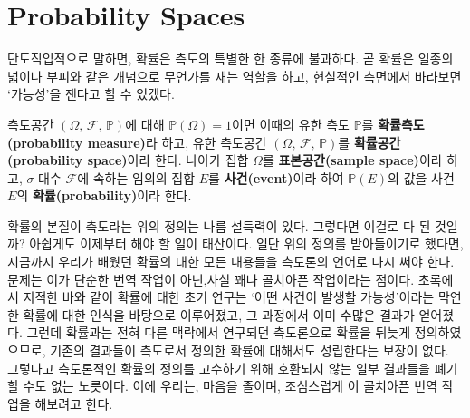 
\section{Probability Spaces}

단도직입적으로 말하면, 확률은 측도의 특별한 한 종류에 불과하다. 곧 확률은 일종의 넓이나 부피와 같은 개념으로 무언가를 재는 역할을 하고, 현실적인 측면에서 바라보면 `가능성'을 잰다고 할 수 있겠다.

\begin{definition}
    측도공간 $(\Omega,\,\mathcal{F},\,\mathbb{P})$에 대해 $\mathbb{P}(\Omega)=1$이면 이때의 유한 측도 $\mathbb{P}$를 \textbf{확률측도(probability measure)}라 하고, 유한 측도공간 $(\Omega,\,\mathcal{F},\,\mathbb{P})$를 \textbf{확률공간(probability space)}이라 한다. 나아가 집합 $\Omega$를 \textbf{표본공간(sample space)}이라 하고, $\sigma$-대수 $\mathcal{F}$에 속하는 임의의 집합 $E$를 \textbf{사건(event)}이라 하여 $\mathbb{P}(E)$의 값을 사건 $E$의 \textbf{확률(probability)}이라 한다.
\end{definition}

확률의 본질이 측도라는 위의 정의는 나름 설득력이 있다. 그렇다면 이걸로 다 된 것일까? 아쉽게도 이제부터 해야 할 일이 태산이다. 일단 위의 정의를 받아들이기로 했다면, 지금까지 우리가 배웠던 확률의 대한 모든 내용들을 측도론의 언어로 다시 써야 한다. 문제는 이가 단순한 번역 작업이 아닌,사실 꽤나 골치아픈 작업이라는 점이다. 초록에서 지적한 바와 같이 확률에 대한 초기 연구는 `어떤 사건이 발생할 가능성'이라는 막연한 확률에 대한 인식을 바탕으로 이루어졌고, 그 과정에서 이미 수많은 결과가 얻어졌다. 그런데 확률과는 전혀 다른 맥락에서 연구되던 측도론으로 확률을 뒤늦게 정의하였으므로, 기존의 결과들이 측도로서 정의한 확률에 대해서도 성립한다는 보장이 없다. 그렇다고 측도론적인 확률의 정의를 고수하기 위해 호환되지 않는 일부 결과들을 폐기할 수도 없는 노릇이다. 이에 우리는, 마음을 졸이며, 조심스럽게 이 골치아픈 번역 작업을 해보려고 한다.

